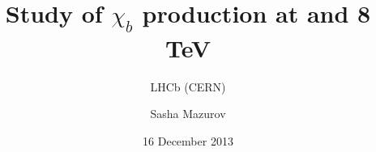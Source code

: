 \title[chib status report]{Study of $\chi_b$ production at  and 8 TeV}
\subtitle{LHCb  (CERN)}
\author{Sasha Mazurov}
\date{16 December 2013}
